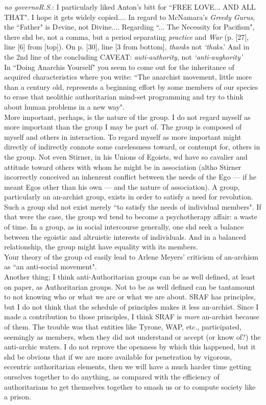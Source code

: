 \noindent \emph{no governoR.S.}:
\indent I particularly liked Anton's bitt for ``FREE LOVE... AND ALL THAT". I hope it gets widely copied.... In regard to McNamara's \emph{Greedy Gurus}, the ``Father" is D\emph{e}vine, not Divine.... Regarding ``... The Necessity for Pacifism", there shd be, not a comma, but a period separating \emph{practice} and \emph{War} (p. [27], line [6] from [top]). On p. [30], line [3 from bottom], \emph{thanks} not \emph{`thaks}.' And in the 2nd line of the concluding CAVEAT: \emph{auti-authority}, not \emph{`anti-aughority'}\\
In ``Doing Anarchis Yourself" you seem to come out for the inheritance of acquired characteristics where you write: ``The anarchist movement, little more than a century old, represents a beginning effort by some members of our species to erase that neolithic authoritarian mind-set programming and try to think about human problems in a new way".\\
More important, perhaps, is the nature of the group. I do not regard myself as more important than the group I may be part of. The group is composed of myself and others in interaction. To regard myself as more important might directly of indirectly connote some carelessness toward, or contempt for, others in the group. Not even Stirner, in his Unions of Egoists, wd have so cavalier and attitude toward others with whom he might be in association (altho Stirner incorrectly conceived an inhenrent conflict between the needs of the Ego --- if he meant Egos other than his own --- and the nature of association). A group, particularly an an-archist group, exists in order to satisfy a need for revolution. Such a group shd not exist merely ``to satisfy the needs of individual members". If that were the case, the group wd tend to become a psychotherapy affair: a waste of time. In a group, as in social intercourse generally, one shd seek a balance between the egoistic and altruistic interests of individuals. And in a balanced relationship, the group might have equality with its members.\\
Your theory of the group cd easily lead to Arlene Meyers' criticism of an-archism as ``an anti-social movement".\\
Another thing; I think anti-Authoritarian groups can be as well defined, at least on paper, as Authoritarian groups. Not to be as well defined can be tantamount to not knowing who or what we are or what we are about. SRAF has principles, but I do not think that the schedule of principles makes it less an-archist. Since I made a contribution to those principles, I think SRAF is \emph{more} an-archist because of them. The trouble was that entities like Tyrone, WAP, etc., participated, seemingly as members, when they did not understand or accept (or know of?) the anti-archic waters. I do not reprove the openness by which this happened, but it shd be obvious that if we are more available for penetration by vigorous, eccentric authoritarian elements, then we will have a much harder time getting ourselves together to do anything, as compared with the efficiency of authoritarians to get themselves together to smash us or to compute society like a prison.\\
